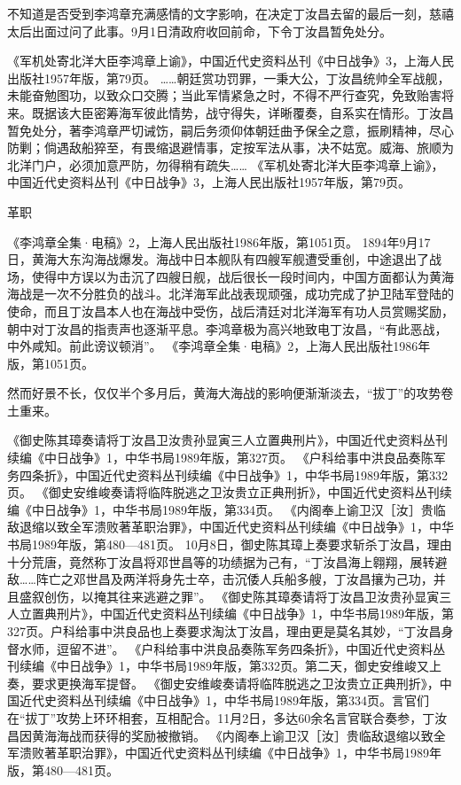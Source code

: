 \documentclass[12pt,UTF8]{ctexbook}
\begin{document}
不知道是否受到李鸿章充满感情的文字影响，在决定丁汝昌去留的最后一刻，慈禧太后出面过问了此事。9月1日清政府收回前命，下令丁汝昌暂免处分。

《军机处寄北洋大臣李鸿章上谕》，中国近代史资料丛刊《中日战争》3，上海人民出版社1957年版，第79页。
……朝廷赏功罚罪，一秉大公，丁汝昌统帅全军战舰，未能奋勉图功，以致众口交腾；当此军情紧急之时，不得不严行查究，免致贻害将来。既据该大臣密筹海军彼此情势，战守得失，详晰覆奏，自系实在情形。丁汝昌暂免处分，著李鸿章严切诫饬，嗣后务须仰体朝廷曲予保全之意，振刷精神，尽心防剿；倘遇敌船猝至，有畏缩退避情事，定按军法从事，决不姑宽。威海、旅顺为北洋门户，必须加意严防，勿得稍有疏失…… 《军机处寄北洋大臣李鸿章上谕》，中国近代史资料丛刊《中日战争》3，上海人民出版社1957年版，第79页。

革职

《李鸿章全集·电稿》2，上海人民出版社1986年版，第1051页。
1894年9月17日，黄海大东沟海战爆发。海战中日本舰队有四艘军舰遭受重创，中途退出了战场，使得中方误以为击沉了四艘日舰，战后很长一段时间内，中国方面都认为黄海海战是一次不分胜负的战斗。北洋海军此战表现顽强，成功完成了护卫陆军登陆的使命，而且丁汝昌本人也在海战中受伤，战后清廷对北洋海军有功人员赏赐奖励，朝中对丁汝昌的指责声也逐渐平息。李鸿章极为高兴地致电丁汝昌，“有此恶战，中外咸知。前此谤议顿消”。 《李鸿章全集·电稿》2，上海人民出版社1986年版，第1051页。

然而好景不长，仅仅半个多月后，黄海大海战的影响便渐渐淡去，“拔丁”的攻势卷土重来。

《御史陈其璋奏请将丁汝昌卫汝贵孙显寅三人立置典刑片》，中国近代史资料丛刊续编《中日战争》1，中华书局1989年版，第327页。
《户科给事中洪良品奏陈军务四条折》，中国近代史资料丛刊续编《中日战争》1，中华书局1989年版，第332页。
《御史安维峻奏请将临阵脱逃之卫汝贵立正典刑折》，中国近代史资料丛刊续编《中日战争》1，中华书局1989年版，第334页。
《内阁奉上谕卫汉［汝］贵临敌退缩以致全军溃败著革职治罪》，中国近代史资料丛刊续编《中日战争》1，中华书局1989年版，第480—481页。
10月8日，御史陈其璋上奏要求斩杀丁汝昌，理由十分荒唐，竟然称丁汝昌将邓世昌等的功绩据为己有，“丁汝昌海上翱翔，展转避敌……阵亡之邓世昌及两洋将身先士卒，击沉倭人兵船多艘，丁汝昌攘为己功，并且盛叙创伤，以掩其往来逃避之罪”。 《御史陈其璋奏请将丁汝昌卫汝贵孙显寅三人立置典刑片》，中国近代史资料丛刊续编《中日战争》1，中华书局1989年版，第327页。户科给事中洪良品也上奏要求淘汰丁汝昌，理由更是莫名其妙，“丁汝昌身督水师，逗留不进”。 《户科给事中洪良品奏陈军务四条折》，中国近代史资料丛刊续编《中日战争》1，中华书局1989年版，第332页。第二天，御史安维峻又上奏，要求更换海军提督。 《御史安维峻奏请将临阵脱逃之卫汝贵立正典刑折》，中国近代史资料丛刊续编《中日战争》1，中华书局1989年版，第334页。言官们在“拔丁”攻势上环环相套，互相配合。11月2日，多达60余名言官联合奏参，丁汝昌因黄海海战而获得的奖励被撤销。 《内阁奉上谕卫汉［汝］贵临敌退缩以致全军溃败著革职治罪》，中国近代史资料丛刊续编《中日战争》1，中华书局1989年版，第480—481页。
\end{document}
